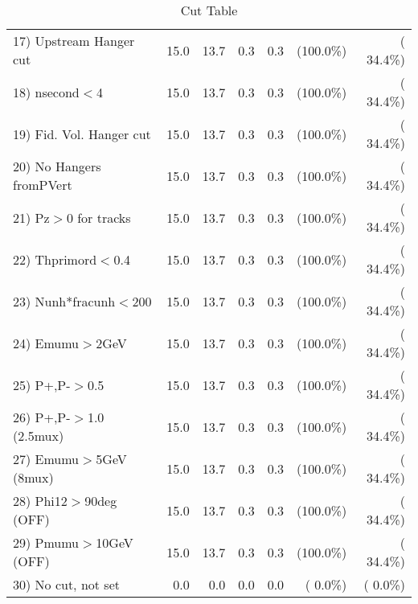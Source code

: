 \begin{table}[h!]
\begin{tabular}{||l||r|r|r|r|r|r||}
 17) Upstream Hanger cut  &         15.0 &         13.7 &          0.3 &          0.3 & (100.0\%) & ( 34.4\%) \\
 18) nsecond$<$4          &         15.0 &         13.7 &          0.3 &          0.3 & (100.0\%) & ( 34.4\%) \\
 19) Fid. Vol. Hanger cut &         15.0 &         13.7 &          0.3 &          0.3 & (100.0\%) & ( 34.4\%) \\
 20) No Hangers fromPVert &         15.0 &         13.7 &          0.3 &          0.3 & (100.0\%) & ( 34.4\%) \\
 21) Pz$>$0 for tracks    &         15.0 &         13.7 &          0.3 &          0.3 & (100.0\%) & ( 34.4\%) \\
 22) Thprimord$<$0.4      &         15.0 &         13.7 &          0.3 &          0.3 & (100.0\%) & ( 34.4\%) \\
 23) Nunh*fracunh$<$200   &         15.0 &         13.7 &          0.3 &          0.3 & (100.0\%) & ( 34.4\%) \\
 24) Emumu$>$2GeV         &         15.0 &         13.7 &          0.3 &          0.3 & (100.0\%) & ( 34.4\%) \\
 25) P+,P-$>$0.5          &         15.0 &         13.7 &          0.3 &          0.3 & (100.0\%) & ( 34.4\%) \\
 26) P+,P-$>$1.0 (2.5mux) &         15.0 &         13.7 &          0.3 &          0.3 & (100.0\%) & ( 34.4\%) \\
 27) Emumu$>$5GeV  (8mux) &         15.0 &         13.7 &          0.3 &          0.3 & (100.0\%) & ( 34.4\%) \\
 28) Phi12$>$90deg  (OFF) &         15.0 &         13.7 &          0.3 &          0.3 & (100.0\%) & ( 34.4\%) \\
 29) Pmumu$>$10GeV  (OFF) &         15.0 &         13.7 &          0.3 &          0.3 & (100.0\%) & ( 34.4\%) \\
 30) No cut, not set      &          0.0 &          0.0 &          0.0 &          0.0 & (  0.0\%) & (  0.0\%) \\
 \hline
 \hline
 \end{tabular}
 \caption{Cut Table           }
 \label{tab-cutheavy_neutrino_4.000}
 \end{table}
